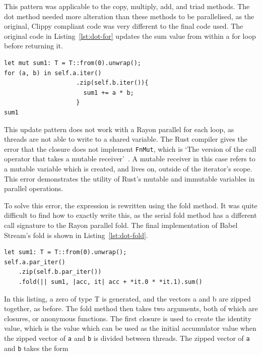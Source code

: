 This pattern was applicable to the copy, multiply, add, and triad methods. The dot method needed more alteration than these methods to be parallelised, as the original, Clippy compliant code was very different to the final code used. The original code in Listing~\ref{lst:dot-for} updates the sum value from within a for loop before returning it.
\begin{code}
\begin{verbatim}
let mut sum1: T = T::from(0).unwrap();
for (a, b) in self.a.iter()
                    .zip(self.b.iter()){
                      sum1 += a * b;
                    }
sum1
\end{verbatim}
\label{lst:dot-for}
\end{code}
This update pattern does not work with a Rayon parallel for each loop, as threads are not able to write to a shared variable. The Rust compiler gives the error that the closure does not implement \texttt{FnMut}, which is `The version of the call operator that takes a mutable receiver'~\cite{rust-doc-fnmut}. A mutable receiver in this case refers to a mutable variable which is created, and lives on, outside of the iterator's scope. This error demonstrates the utility of Rust's mutable and immutable variables in parallel operations.

To solve this error, the expression is rewritten using the fold method. It was quite difficult to find how to exactly write this, as the serial fold method has a different call signature to the Rayon parallel fold. The final implementation of Babel Stream's fold is shown in Listing~\ref{lst:dot-fold}.
\begin{code}
\begin{verbatim}
let sum1: T = T::from(0).unwrap();
self.a.par_iter()
    .zip(self.b.par_iter())
    .fold(|| sum1, |acc, it| acc + *it.0 * *it.1).sum()
\end{verbatim}
\label{lst:dot-fold}
\end{code}
In this listing, a zero of type T is generated, and the vectors a and b are zipped together, as before. The fold method then takes two arguments, both of which are closures, or anonymous functions. The first closure is used to create the identity value, which is the value which can be used as the initial accumulator value when the zipped vector of \texttt{a} and \texttt{b} is divided between threads. The zipped vector of \texttt{a} and \texttt{b} takes the form

